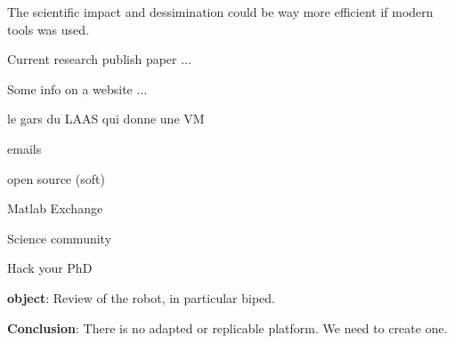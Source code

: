 The scientific impact and dessimination could be way more efficient if modern tools was used.

Current research
publish paper ...

Some info on a website ...

le gars du LAAS qui donne une VM

emails

open source (soft)

Matlab Exchange

Science community

Hack your PhD


\textbf{object}: Review of the robot, in particular biped.


\textbf{Conclusion}: There is no adapted or replicable platform.
We need to create one.

